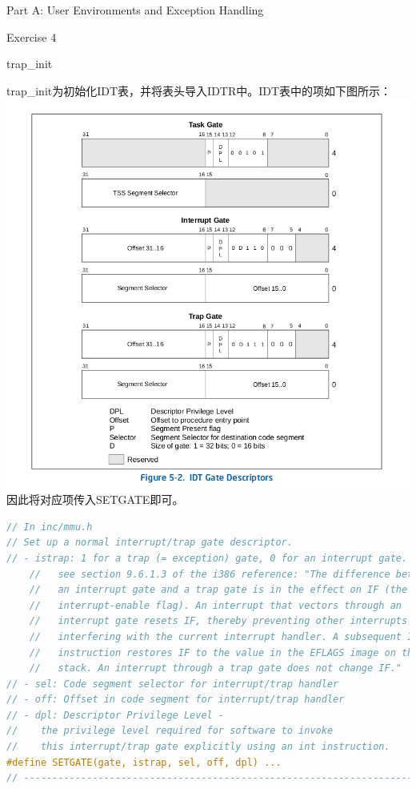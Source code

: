 \documentclass[GBK,winfonts,a4paper,10pt]{ctexart}
\begin{document}
\begin{section}{ Part A: User Environments and Exception Handling }
\begin{subsection}{ Exercise 4 }
\begin{subsubsection}{ trap\_init }
\par
trap\_init为初始化IDT表，并将表头导入IDTR中。IDT表中的项如下图所示：
\includegraphics[scale=0.5]{IDTGateDescriptors.png}
因此将对应项传入SETGATE即可。
\begin{lstlisting}[language=C]
// In inc/mmu.h
// Set up a normal interrupt/trap gate descriptor.
// - istrap: 1 for a trap (= exception) gate, 0 for an interrupt gate.
    //   see section 9.6.1.3 of the i386 reference: "The difference between
    //   an interrupt gate and a trap gate is in the effect on IF (the
    //   interrupt-enable flag). An interrupt that vectors through an
    //   interrupt gate resets IF, thereby preventing other interrupts from
    //   interfering with the current interrupt handler. A subsequent IRET
    //   instruction restores IF to the value in the EFLAGS image on the
    //   stack. An interrupt through a trap gate does not change IF."
// - sel: Code segment selector for interrupt/trap handler
// - off: Offset in code segment for interrupt/trap handler
// - dpl: Descriptor Privilege Level -
//	  the privilege level required for software to invoke
//	  this interrupt/trap gate explicitly using an int instruction.
#define SETGATE(gate, istrap, sel, off, dpl) ...
// ----------------------------------------------------------------------------


\end{lstlisting}
\end{subsubsection}
\end{subsection}
\end{section}
\end{document}
